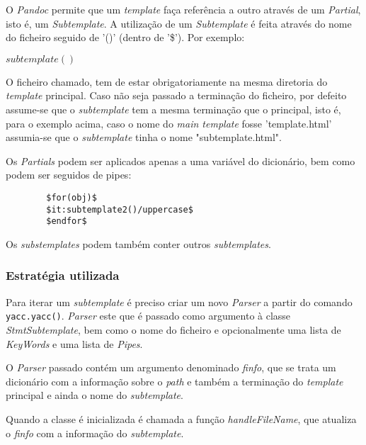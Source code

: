 \documentclass[../relatorio.tex]{subfiles}
\begin{document}
    O \textit{Pandoc} permite que um \textit{template} faça referência a outro
    através de um \textit{Partial}, isto é, um \textit{Subtemplate}. A utilização
    de um \textit{Subtemplate} é feita através do nome do ficheiro seguido de '()'
    (dentro de '\$'). Por exemplo:

    \texttt{$subtemplate()$}

    O ficheiro chamado, tem de estar obrigatoriamente na mesma diretoria do \textit{template}
    principal. Caso não seja passado a terminação do ficheiro, por defeito assume-se que o
    \textit{subtemplate} tem a mesma terminação que o principal, isto é, para o exemplo acima, caso o nome do
    \textit{main template} fosse 'template.html' assumia-se que o \textit{subtemplate} tinha o nome "subtemplate.html".
    
    Os \textit{Partials} podem ser aplicados apenas a uma variável do dicionário, bem como podem ser seguidos de pipes:

    \begin{verbatim}
        $for(obj)$
        $it:subtemplate2()/uppercase$
        $endfor$
    \end{verbatim}

    Os \textit{substemplates} podem também conter outros \textit{subtemplates}.

    \subsubsection{Estratégia utilizada}

    Para iterar um \textit{subtemplate} é preciso criar um novo \textit{Parser} a partir do
    comando \texttt{yacc.yacc()}. \textit{Parser} este que é passado como argumento
    à classe \textit{StmtSubtemplate}, bem como o nome do ficheiro e opcionalmente uma lista
    de \textit{KeyWords} e uma lista de \textit{Pipes}. 
    
    O \textit{Parser} passado contém um argumento denominado \textit{finfo}, que se trata um dicionário com a informação
    sobre o \textit{path} e também a terminação do \textit{template} principal e ainda o nome do \textit{subtemplate}. 

    Quando a classe é inicializada é chamada a função \textit{handleFileName}, que atualiza o \textit{finfo} com a 
    informação do \textit{subtemplate}.

    \inputminted[firstline=14, lastline=21]{py}{../modules/Stmt/StmtSubtemplate.py}
\end{document}
